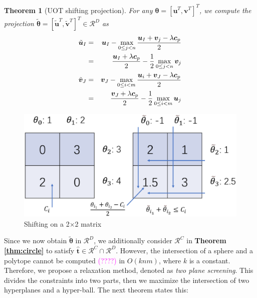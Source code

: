 \documentclass[twoside]{article}
\theoremstyle{plain}
\newtheorem{thm}{Theorem}
\newcommand{\tranT}{T}
\renewcommand{\vec}[1]{\bm{#1}}
\newcommand{\note}[1]{\textcolor{magenta}{#1}}
\begin{document}
\begin{thm}[UOT shifting projection]
\label{Thm:UOT_ShiftProjection}
For any $\vec{\theta} = [{\vec{u}}^{\tranT},{\vec{v}}^{\tranT}]^{\tranT}$, we compute the projection $\tilde{\vec{\theta}} = [\tilde{\vec{u}}^{\tranT},\tilde{\vec{v}}^{\tranT}]^{\tranT} \in \mathcal{R}^{D}$ as
\begin{eqnarray}
\tilde{\vec{u}}_I &=& {\vec{u}}_I - \max_{0\leq j < n} \frac{{\vec{u}}_I +{\vec{v}}_j - \lambda\vec{c}_{p}}{2} \notag\\
& =& \frac{{\vec{u}}_I +\lambda\vec{c}_{p}}{2} - \frac{1}{2}\max_{0\leq j < n} {\vec{v}}_j\\
\tilde{\vec{v}}_J &=& {\vec{v}}_J - \max_{0 \leq i < m} \frac{{\vec{u}}_i +{\vec{v}}_J - \lambda\vec{c}_{p}}{2}\notag\\
& =& \frac{{\vec{v}}_J +\lambda\vec{c}_{p}}{2} - \frac{1}{2}\max_{0 \leq i < m} {\vec{u}}_j
 \label{eq:uotproj}
\end{eqnarray}
\end{thm}
	\begin{figure}[h]
	\begin{center}	
	\includegraphics[width = \linewidth]{pic/shifting}
	\caption{Shifting on a 2$\times$2 matrix}
	\end{center}	
	\end{figure}


Since we now obtain $\tilde{\vec{\theta}}$ in $\mathcal{R}^{D}$, we additionally consider $\mathcal{R}^{C}$ in {\bf Theorem \ref{thm:circle}} to satisfy $\hat{\vec{t}} \in \mathcal{R}^{C}\cap\mathcal{R}^{D}$. However, the intersection of a sphere and a polytope cannot be computed \note{(????)} in $O(knm)$, where $k$ is a constant. Therefore, we propose a relaxation method, denoted as {\it two plane screening}. This divides the constraints into two parts, then we maximize the intersection of two hyperplanes and a hyper-ball. The next theorem states this:
%
\end{document}
